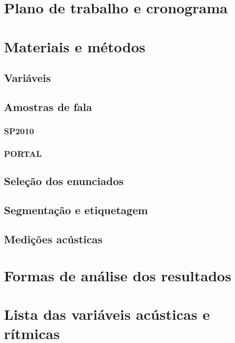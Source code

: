 \documentclass[
			a4paper,		%
			12pt,			%
			]{article}		%
\begin{document}
\section{Plano de trabalho e cronograma}
	
\section{Materiais e métodos}

	\subsection{Variáveis}

	\subsection{Amostras de fala} \label{Amostras}
	
		\subsubsection{SP2010}
		
		\subsubsection{PORTAL}

	\subsection{Seleção dos enunciados}

	\subsection{Segmentação e etiquetagem}

	\subsection{Medições acústicas}
	
\section{Formas de análise dos resultados}

\section{Lista das variáveis acústicas e rítmicas}

{ %
	\printbibliography
}
\end{document}
